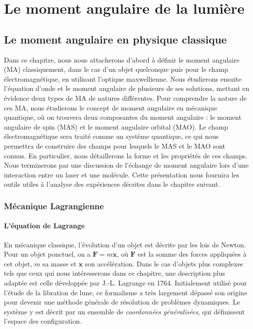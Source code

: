 \part{Le moment angulaire de la lumière}
\label{PA:LightAM}
\chapter{Le moment angulaire en physique classique}
\label{CH:ClassicAM}
Dans ce chapitre, nous nous attacherons d'abord à définir le moment angulaire (MA) classiquement, dans le cas d'un objet quelconque puis pour le champ électromagnétique, en utilisant l'optique maxwellienne. Nous étudierons ensuite l'équation d'onde et le moment angulaire de plusieurs de ses solutions, mettant en évidence deux types de MA de natures différentes. Pour comprendre la nature de ces MA, nous étudierons le concept de moment angulaire en mécanique quantique, où on trouvera deux composantes du moment angulaire : le moment angulaire de spin (MAS) et le moment angulaire orbital (MAO). Le champ électromagnétique sera traité comme un système quantique, ce qui nous permettra de construire des champs pour lesquels le MAS et le MAO sont connus. En particulier, nous détaillerons la forme et les propriétés de ces champs. Nous terminerons par une discussion de l'échange de moment angulaire lors d'une interaction entre un laser et une molécule. Cette présentation nous fournira les outils utiles à l'analyse des expériences décrites dans le chapitre suivant.
\newpage
\section{Mécanique Lagrangienne}
\subsection{L'\'{e}quation de Lagrange}
\label{sec:lagrange}
En mécanique classique, l'évolution d'un objet est décrite par les lois de Newton. Pour un objet ponctuel, on a $\bm{F}=m\bm{\ddot{x}}$, où $\bm{F}$ est la somme des forces appliquées à cet objet, $m$ sa masse et $\bm{\ddot{x}}$ son accélération. Dans le cas d'objets plus complexes tels que ceux qui nous intéresserons dans ce chapitre, une description plus adaptée est celle développée par J.-L. Lagrange en 1764. Initialement utilisé pour l'étude de la libration de lune, ce formalisme a très largement dépassé son origine pour devenir une méthode générale de résolution de problèmes dynamiques. Le système y est décrit par un ensemble de \textit{coordonnées généralisées}, qui définissent l'espace des configuration. 

